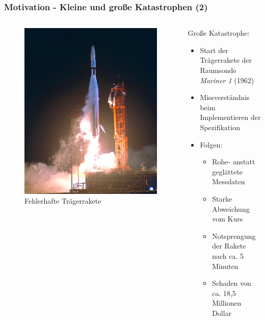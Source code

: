 %
%
\begin{frame}
	\frametitle{Motivation -  Kleine und große Katastrophen (2)}
	\begin{columns}
		\begin{column}{0.48\textwidth}
			\begin{figure}
				\includegraphics[scale=0.6]{grafiken/mariner}		
				\caption{Fehlerhafte Trägerrakete
					\footnotemark		
				}		
			\end{figure}
		\end{column}
		\begin{column}{0.48\textwidth}
			Große Katastrophe:
			\begin{itemize}
				\item Start der Trägerrakete der Raumsonde \emph{Mariner 1} (1962)
				\pause
				\item Missverständnis beim Implementieren der Spezifikation
				\pause
				\item Folgen:
				\begin{itemize}
					\item Rohe- anstatt geglättete Messdaten
					\item Starke Abweichung vom Kurs
					\item Notsprengung der Rakete nach ca. 5 Minuten
					\item Schaden von ca. 18,5 Millionen Dollar
				\end{itemize}
			\end{itemize}
		\end{column}
		
	\end{columns}
\end{frame}
